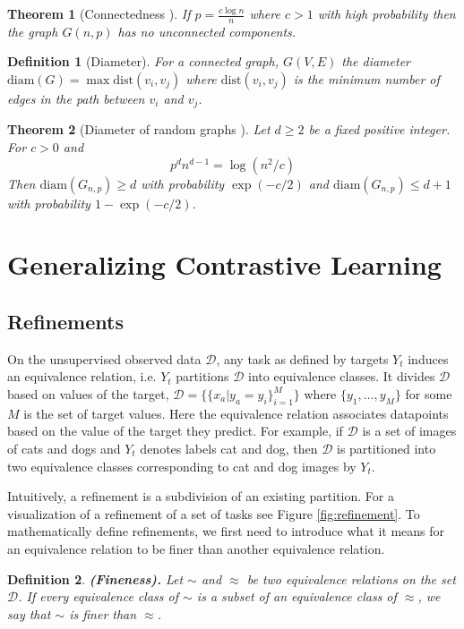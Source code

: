 \documentclass{article}
\newtheorem{theorem}{Theorem}
\newtheorem{definition}{Definition}
\begin{document}
\begin{theorem}[Connectedness \citep{erdHos1960evolution}\label{thm:connected}]
If $p=\frac{c \log n}{n}$ where $c>1$ with high probability then the graph $G(n, p)$ has no unconnected components.
\end{theorem}

\begin{definition}[Diameter]
For a connected graph, $G(V, E)$ the diameter $\text{diam}(G) =  \max \text{dist}(v_i, v_j)$ where $\text{dist}(v_i, v_j)$ is the minimum number of edges in the path between $v_i$ and $v_j$.
\end{definition}

\begin{theorem}[Diameter of random graphs \citep{frieze2016introduction}\label{thm:diam}]
Let $d\geq2$ be a fixed positive integer. For $c>0$ and
$$
p^d n^{d-1} = \log(n^2/c)
$$
Then $\text{diam}(G_{n,p})\geq d$ with probability $\exp(-c/2)$ and $\text{diam}(G_{n,p}) \leq d+1$ with probability $1-\exp(-c/2)$.
\end{theorem} \section{Generalizing Contrastive Learning} \label{sec:refinements_app}

\subsection{Refinements}

On the unsupervised observed data $\mathcal{D}$, any task as defined by targets $Y_{t}$ induces an equivalence relation, i.e. $Y_{t}$ partitions $\mathcal{D}$ into equivalence classes. 
It divides $\mathcal{D}$ based on values of the target, $\mathcal{D} = \{ \{ x_a \vert y_a=y_i\}_{i=1}^{M}\}$ where $\{ y_{1}, \dots, y_{M}\}$ for some $M$ is the set of target values. Here the equivalence relation associates datapoints based on the value of the target they predict. 
For example, if $\mathcal{D}$ is a set of images of cats and dogs and $Y_{t}$ denotes labels cat and dog, then $\mathcal{D}$ is partitioned into two equivalence classes corresponding to cat and dog images by $Y_{t}$. 

Intuitively, a refinement is a subdivision of an existing partition. 
For a visualization of a refinement of a set of tasks see Figure \ref{fig:refinement}.
To mathematically define refinements, we first need to introduce what it means for an equivalence relation to be finer than another equivalence relation.
\begin{definition}{\bf (Fineness).}
Let $\sim$ and $\approx$ be two equivalence relations on the set $\mathcal{D}$. If every equivalence class of $\sim$ is a subset of an equivalence class of $\approx$, we say that $\sim$ is \textit{finer} than $\approx$.
\end{definition}
\end{document}
